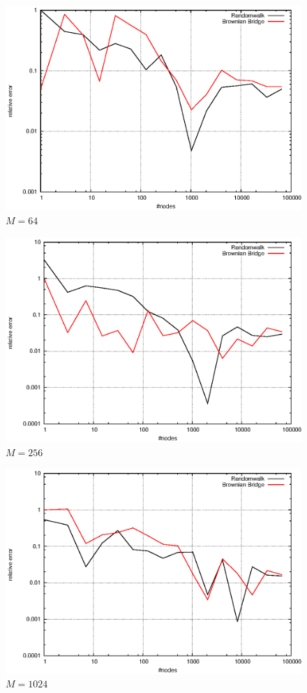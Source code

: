 \documentclass[]{article}
\begin{document}
\begin{figure}[!ht]
\centering
\includegraphics[width=.9\textwidth]{task4_mc_64.eps}
\caption{$M=64$}
\label{fig:Task4b}
\end{figure}

\begin{figure}[!ht]
\centering
\includegraphics[width=.9\textwidth]{task4_mc_256.eps}
\caption{$M=256$}
\label{fig:Task4c}
\end{figure}

\begin{figure}[!ht]
\centering
\includegraphics[width=.9\textwidth]{task4_mc_1024.eps}
\caption{$M=1024$}
\label{fig:Task4d}
\end{figure}
\clearpage
\end{document}
